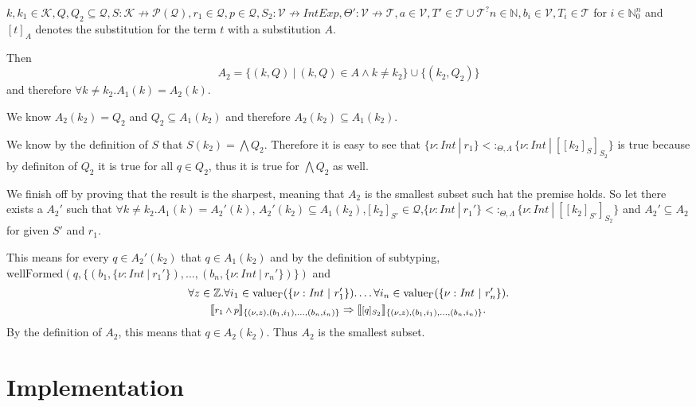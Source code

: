 \documentclass[]{scrbook}
\newcommand{\semantic}[1]{\llbracket \text{\footnotesize\texttt{#1}} \rrbracket}
\theoremstyle{definition}
\theoremstyle{definition}
\theoremstyle{definition}
\theoremstyle{remark}
\begin{document}
\(k,k_1\in\mathcal{K},Q,Q_2\subseteq\mathcal{Q},S:\mathcal{K}\nrightarrow\mathcal{P}(\mathcal{Q}),r_1\in\mathcal{Q},p\in\mathcal{Q},S_2:\mathcal{V}\nrightarrow\mathit{IntExp},\Theta':\mathcal{V}\nrightarrow\mathcal{T}, a\in\mathcal{V},T'\in\mathcal{T}\cup\mathcal{T}^?n\in\mathbb{N}, b_i\in\mathcal{V},T_i\in\mathcal{T}\)
for \(i\in\mathbb{N}_0^n\) and \([t]_A\) denotes the substitution for
the term \(t\) with a substitution \(A\).

Then
\[A_2 = \{(k,Q)\ |\ (k,Q)\in A \land k \neq k_2\}\cup\{(k_2,Q_2)\}\] and
therefore \(\forall k\neq k_2. A_1(k) = A_2(k)\).

We know \(A_2(k_2) = Q_2\) and \(Q_2\subseteq A_1(k_2)\) and therefore
\(A_2(k_2)\subseteq A_1(k_2)\).

We know by the definition of \(S\) that \(S(k_2) = \bigwedge Q_2\).
Therefore it is easy to see that
\(\{\nu:\mathit{Int}\ |\ r_1\}<:_{\Theta,\Lambda} \{\nu:\mathit{Int}\ |\ [[k_2]_S]_{S_2}\}\)
is true because by definiton of \(Q_2\) it is true for all \(q\in Q_2\),
thus it is true for \(\bigwedge Q_2\) as well.

We finish off by proving that the result is the sharpest, meaning that
\(A_2\) is the smallest subset such hat the premise holds. So let there
exists a \(A_2'\) such that \(\forall k\neq k_2. A_1(k) = A_2'(k)\),
\(A_2'(k_2)\subseteq A_1(k_2)\),\([k_2]_{S'}\in\mathcal{Q}\),\(\{\nu:\mathit{Int}\ |\ r_1'\}<:_{\Theta,\Lambda} \{\nu:\mathit{Int}\ |\ [[k_2]_{S'}]_{S_2}\}\)
and \(A_2'\subseteq A_2\) for given \(S'\) and \(r_1\).

This means for every \(q\in A_2'(k_2)\) that \(q\in A_1(k_2)\) and by
the definition of subtyping,
\(\text{wellFormed}(q,\{(b_1,\{\nu:\mathit{Int}\ |\ r_1'\}),\dots,(b_n,\{\nu:\mathit{Int}\ |\ r_n'\})\})\)
and \[
\begin{aligned}
&\forall z\in\mathbb{Z}.\forall i_1\in\text{value}_\Gamma(\{\nu:\mathit{Int}\ |\ r_1'\}).\dots \forall i_n\in\text{value}_\Gamma(\{\nu:\mathit{Int}\ |\ r_n'\}).\\
&\quad\quad\semantic{$r_1\land p$}_{\{(\nu,z),(b_1,i_1),\dots,(b_n,i_n)\}}\Rightarrow\semantic{$[q]_{S_2}$}_{\{(\nu,z),(b_1,i_1),\dots,(b_n,i_n)\}}.
\end{aligned}
\] By the definition of \(A_2\), this means that \(q\in A_2(k_2)\). Thus
\(A_2\) is the smallest subset.

\chapter{Implementation}\label{implementation}
\end{document}
